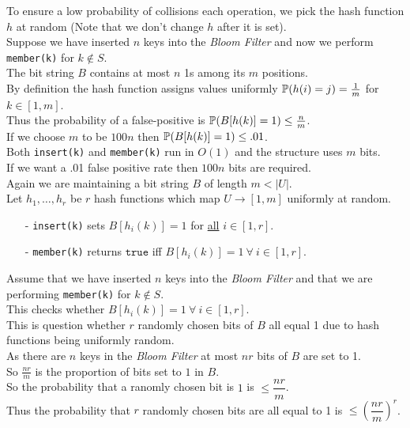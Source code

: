 \documentclass[11pt,a4paper]{article}
\begin{document}
To ensure a low probability of collisions each operation, we pick the hash function $h$ at random (Note that we don't change $h$ after it is set).\\

Suppose we have inserted $n$ keys into the \textit{Bloom Filter} and now we perform \lstinline!member(k)! for $k\not\in S$.\\
The bit string $B$ contains at most $n$ 1s among its $m$ positions.\\
By definition the hash function assigns values uniformly $\mathbb{P}(h(i)=j)=\frac1m$ for $k\in[1,m]$.\\
Thus the probability of a false-positive is $\mathbb{P}(B[h(k)]=1)\leq\frac{n}m$.\\
If we choose $m$ to be $100n$ then $\mathbb{P}(B[h(k)]=1)\leq.01$.\\

Both \lstinline!insert(k)! and \lstinline!member(k)! run in $O(1)$ and the structure uses $m$ bits.\\
If we want a .01 false positive rate then $100n$ bits are required.\\

Again we are maintaining a bit string $B$ of length $m<|U|$.\\
Let $h_1,\dots,h_r$ be $r$ hash functions which map $U\to[1,m]$ uniformly at random.
\begin{itemize}
	\item[-] \lstinline!insert(k)! sets $B[h_i(k)]=1$ for \underline{all} $i\in[1,r]$.
	\item[-] \lstinline!member(k)! returns $\mathtt{true}$ iff $B[h_i(k)]=1\ \forall\ i\in[1,r]$.
\end{itemize}

Assume that we have inserted $n$ keys into the \textit{Bloom Filter} and that we are performing \lstinline!member(k)! for $k\not\in S$.\\
This checks whether $B[h_i(k)]=1\ \forall\ i\in[1,r]$.\\
This is question whether $r$ randomly chosen bits of $B$ all equal 1 due to hash functions being uniformly random.\\
As there are $n$ keys in the \textit{Bloom Filter} at most $nr$ bits of $B$ are set to 1.\\
So $\frac{nr}{m}$ is the proportion of bits set to $1$ in $B$.\\
So the probability that a ranomly chosen bit is $1$ is $\leq\dfrac{nr}{m}$.\\
Thus the probability that $r$ randomly chosen bits are all equal to 1 is $\leq\left(\dfrac{nr}{m}\right)^r$.\\
\end{document}
